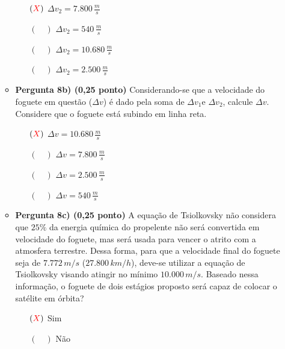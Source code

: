 \documentclass[a4paper, 12pt]{article}
\newcommand{\red}[1]{\textcolor{red}{#1}}
\begin{document}
\begin{flushleft}
\begin{itemize}
\begin{itemize}
                        \begin{itemize}
                            \item[$(\red{X})$] $\Delta v_2 = 7.800 \, \frac{m}{s}$
                            \item[$(\quad)$] $\Delta v_2 = 540 \, \frac{m}{s}$
                            \item[$(\quad)$] $\Delta v_2 = 10.680 \, \frac{m}{s}$
                            \item[$(\quad)$] $\Delta v_2 = 2.500 \, \frac{m}{s}$
                        \end{itemize}
                    \item \textbf{Pergunta 8b) (0,25 ponto)} Considerando-se que a velocidade do foguete em questão ($\Delta v$) é dado pela soma de $\Delta v_1$e $\Delta v_2$, calcule $\Delta v$. Considere que o foguete está subindo em linha reta.
                        \begin{itemize}
                            \item[$(\red{X})$] $\Delta v = 10.680 \, \frac{m}{s}$
                            \item[$(\quad)$] $\Delta v = 7.800 \, \frac{m}{s}$
                            \item[$(\quad)$] $\Delta v = 2.500 \, \frac{m}{s}$
                            \item[$(\quad)$] $\Delta v = 540 \, \frac{m}{s}$
                        \end{itemize}
                    \item \textbf{Pergunta 8c) (0,25 ponto)} A equação de Tsiolkovsky não considera que $25\%$ da energia química do propelente não será convertida em velocidade do foguete, mas será usada para vencer o atrito com a atmosfera terrestre. Dessa forma, para que a velocidade final do foguete seja de $7.772 \, m/s$ ($27.800 \, km/h$), deve-se utilizar a equação de Tsiolkovsky visando atingir no mínimo $10.000 \, m/s$. Baseado nessa informação, o foguete de dois estágios proposto será capaz de colocar o satélite em órbita?
                        \begin{itemize}
                            \item[$(\red{X})$] Sim
                            \item[$(\quad)$] Não
                        \end{itemize}
                \end{itemize}
            

\end{itemize}
\end{flushleft}
\end{document}
